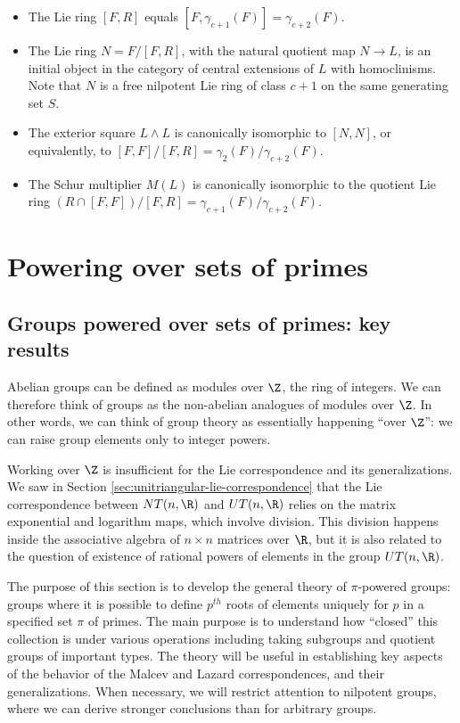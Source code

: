 \documentclass{ucetd}
\begin{document}
\begin{itemize}
\item The Lie ring $[F,R]$ equals $[F,\gamma_{c+1}(F)] = \gamma_{c+2}(F)$.
\item The Lie ring $N = F/[F,R]$, with the natural quotient map $N \to
  L$, is an initial object in the category of central extensions of
  $L$ with homoclinisms. Note that $N$ is a free nilpotent Lie ring of
  class $c + 1$ on the same generating set $S$.
\item The exterior square $L \wedge L$ is canonically isomorphic to
  $[N,N]$, or equivalently, to $[F,F]/[F,R] =
  \gamma_2(F)/\gamma_{c+2}(F)$.
\item The Schur multiplier $M(L)$ is canonically isomorphic to the
  quotient Lie ring $(R \cap [F,F])/[F,R] =
  \gamma_{c+1}(F)/\gamma_{c+2}(F)$.
\end{itemize}

\chapter{Powering over sets of primes}

\section{Groups powered over sets of primes: key results}\label{sec:group-powering}

Abelian groups can be defined as modules over $\Z$, the ring of
integers. We can therefore think of groups as the non-abelian
analogues of modules over $\Z$. In other words, we can think of group
theory as essentially happening ``over $\Z$'': we can raise group
elements only to integer powers.

Working over $\Z$ is insufficient for the Lie correspondence and its
generalizations. We saw in Section
\ref{sec:unitriangular-lie-correspondence} that the Lie correspondence
between $NT(n,\R)$ and $UT(n,\R)$ relies on the matrix exponential and
logarithm maps, which involve division. This division happens inside
the associative algebra of $n \times n$ matrices over $\R$, but it is
also related to the question of existence of rational powers of
elements in the group $UT(n,\R)$.

The purpose of this section is to develop the general theory of
$\pi$-powered groups: groups where it is possible to define $p^{th}$
roots of elements uniquely for $p$ in a specified set $\pi$ of
primes. The main purpose is to understand how ``closed'' this
collection is under various operations including taking subgroups and
quotient groups of important types. The theory will be useful in
establishing key aspects of the behavior of the Malcev and Lazard
correspondences, and their generalizations. When necessary, we will
restrict attention to nilpotent groups, where we can derive stronger
conclusions than for arbitrary groups.
\end{document}
